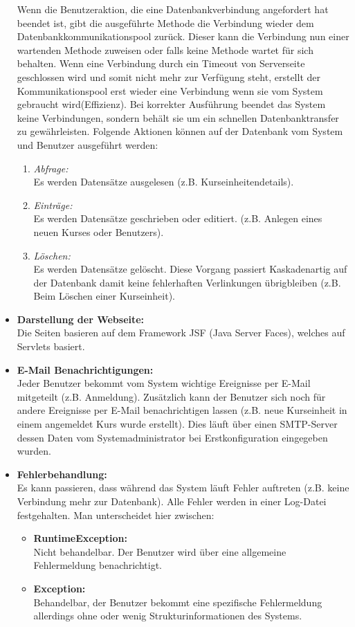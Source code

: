 \begin{itemize}
			Wenn die Benutzeraktion, die eine Datenbankverbindung angefordert hat beendet ist, gibt die ausgeführte Methode die Verbindung wieder dem Datenbankkommunikationspool zurück. Dieser kann die Verbindung nun einer wartenden Methode zuweisen oder falls keine Methode wartet für sich behalten. Wenn eine Verbindung durch ein Timeout von Serverseite geschlossen wird und somit nicht mehr zur Verfügung steht, erstellt der Kommunikationspool erst wieder eine Verbindung wenn sie vom System gebraucht wird(Effizienz). Bei korrekter Ausführung beendet das System keine Verbindungen, sondern behält sie um ein schnellen Datenbanktransfer zu gewährleisten. Folgende Aktionen können auf der Datenbank vom System und Benutzer ausgeführt werden:
			\begin{enumerate}
				\item \emph{Abfrage:} \\
				Es werden Datensätze ausgelesen (z.B. Kurseinheitendetails).
				\item \emph{Einträge:}\\
				 Es werden Datensätze geschrieben oder editiert. (z.B. Anlegen eines neuen Kurses oder Benutzers).
				\item \emph{Löschen:} \\
				Es werden Datensätze gelöscht. Diese Vorgang passiert Kaskadenartig auf der Datenbank damit keine fehlerhaften Verlinkungen übrigbleiben (z.B. Beim Löschen einer Kurseinheit).
				
			\end{enumerate}
			
			\item \textbf{Darstellung der Webseite:} \\
			Die Seiten basieren auf dem Framework JSF (Java Server Faces), welches auf Servlets basiert. 
			
			\item \textbf{E-Mail Benachrichtigungen:}\\
			 Jeder Benutzer bekommt vom System wichtige Ereignisse per E-Mail mitgeteilt (z.B. Anmeldung). Zusätzlich kann der Benutzer sich noch für andere Ereignisse per E-Mail benachrichtigen lassen (z.B. neue Kurseinheit in einem angemeldet Kurs wurde erstellt). Dies läuft über einen SMTP-Server dessen Daten vom Systemadministrator bei Erstkonfiguration eingegeben wurden.
			
			\item \textbf{Fehlerbehandlung:} \\
			Es kann passieren, dass während das System läuft Fehler auftreten (z.B. keine Verbindung mehr zur Datenbank). Alle Fehler werden in einer Log-Datei festgehalten. Man unterscheidet hier zwischen:
			\begin{itemize}
				\item \textbf{RuntimeException:}\\
				 Nicht behandelbar. Der Benutzer wird über eine allgemeine Fehlermeldung benachrichtigt.
				\item \textbf{Exception:} \\
				Behandelbar, der Benutzer bekommt eine spezifische Fehlermeldung allerdings ohne oder wenig Strukturinformationen des Systems.
				\end{itemize}
			

\end{itemize}
